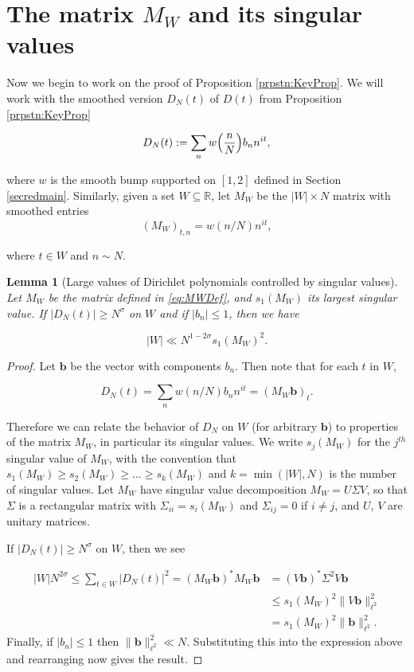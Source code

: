\documentclass{amsart}
\theoremstyle{plain}
\newtheorem{lmm}[thrm]{Lemma}
\numberwithin{equation}{section}
\begin{document}
\section{The  matrix \texorpdfstring{$M_W$}{MW} and its singular values}

Now we begin to work on the proof of Proposition \ref{prpstn:KeyProp}.  We will work with the smoothed version $D_N(t)$ of $D(t)$ from Proposition \ref{prpstn:KeyProp}

\begin{equation}
D_N(t) :=\sum_{n} w\Bigl(\frac{n}{N}\Bigr)b_n n^{it}, 
\label{eq:DNDef}
\end{equation}

\noindent where $w$ is the smooth bump supported on $[1,2]$ defined in Section \ref{secredmain}. Similarly, given a set $W\subseteq\mathbb{R}$, let $M_W$ be the $|W|\times N$ matrix with smoothed entries
\begin{equation}
(M_W)_{t,n}=w(n/N)n^{it}, 
\label{eq:MWDef}
\end{equation}

\noindent where $t \in W$ and $n \sim N$. 

%
%


\begin{lmm}[Large values of Dirichlet polynomials controlled by singular values]\label{lmm:SpectralBound}
Let $M_W$ be the matrix defined in \eqref{eq:MWDef}, and $s_1(M_W)$ its largest singular value. If $|D_N(t)| \ge N^\sigma$ on $W$ and if $|b_n| \le 1$, then we have

\[
|W|\ll N^{1-2\sigma}s_1(M_W)^2.
\]

\end{lmm}
%
%
%
\begin{proof}
Let $\mathbf{b}$ be the vector with components $b_n$.   Then note that for each $t$ in $W$, 

\[ 
D_N(t) =\sum_{n} w(n/N)b_n n^{it}= (M_W \mathbf{b})_t.  
\]

Therefore we can relate the behavior of $D_N$ on $W$ (for arbitrary $\mathbf{b}$) to properties of the matrix $M_W$, in particular its singular values.  We write $s_j(M_W)$ for the $j^{th}$ singular value of $M_W$,  with the convention that $s_1(M_W) \ge s_2(M_W) \ge ...\ge s_k(M_W)$ and $k=\min(|W|,N)$ is the number of singular values.   Let $M_W$ have singular value decomposition $M_W=U\Sigma V$, so that $\Sigma$ is a rectangular matrix with $\Sigma_{ii}=s_i(M_W)$ and $\Sigma_{ij}=0$ if $i\ne j$, and $U$, $V$ are unitary matrices.

If $|D_N(t)| \ge N^\sigma$ on $W$,  then we see

\begin{align*}
|W| N^{2 \sigma} \le \sum_{t\in W}|D_N(t)|^2=(M_W\mathbf{b})^* M_W \mathbf{b}&=(V\mathbf{b})^* \Sigma^2 V\mathbf{b}\\
&\le s_1(M_W)^2 \| V\mathbf{b} \|_{\ell^2}^2\\
&= s_1(M_W)^2 \| \mathbf{b} \|_{\ell^2}^2.
\end{align*}
Finally, if $|b_n|\le 1$ then $\| \mathbf{b} \|_{\ell^2}^2\ll N$. Substituting this into the expression above and rearranging now gives the result.
\end{proof}
\end{document}
